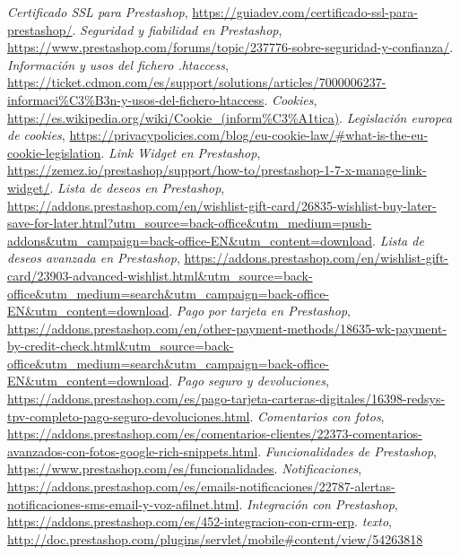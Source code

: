 \documentclass{article}
\begin{document}
\begin{thebibliography}{9}
 \textit{Certificado SSL para Prestashop}, \url{https://guiadev.com/certificado-ssl-para-prestashop/}.
 \textit{Seguridad y fiabilidad en Prestashop}, \url{https://www.prestashop.com/forums/topic/237776-sobre-seguridad-y-confianza/}.
 \textit{Información y usos del fichero .htaccess}, \url{https://ticket.cdmon.com/es/support/solutions/articles/7000006237-informaci\%C3\%B3n-y-usos-del-fichero-htaccess}.
 \textit{Cookies}, \url{https://es.wikipedia.org/wiki/Cookie_(inform\%C3\%A1tica)}.
 \textit{Legislación europea de cookies}, \url{https://privacypolicies.com/blog/eu-cookie-law/#what-is-the-eu-cookie-legislation}.
 \textit{Link Widget en Prestashop}, \url{https://zemez.io/prestashop/support/how-to/prestashop-1-7-x-manage-link-widget/}.
 \textit{Lista de deseos en Prestashop}, \url{https://addons.prestashop.com/en/wishlist-gift-card/26835-wishlist-buy-later-save-for-later.html?utm_source=back-office&utm_medium=push-addons&utm_campaign=back-office-EN&utm_content=download}.
 \textit{Lista de deseos avanzada en Prestashop}, \url{https://addons.prestashop.com/en/wishlist-gift-card/23903-advanced-wishlist.html&utm_source=back-office&utm_medium=search&utm_campaign=back-office-EN&utm_content=download}.
 \textit{Pago por tarjeta en Prestashop}, \url{https://addons.prestashop.com/en/other-payment-methods/18635-wk-payment-by-credit-check.html&utm_source=back-office&utm_medium=search&utm_campaign=back-office-EN&utm_content=download}.
 \textit{Pago seguro y devoluciones}, \url{https://addons.prestashop.com/es/pago-tarjeta-carteras-digitales/16398-redsys-tpv-completo-pago-seguro-devoluciones.html}.
 \textit{Comentarios con fotos}, \url{https://addons.prestashop.com/es/comentarios-clientes/22373-comentarios-avanzados-con-fotos-google-rich-snippets.html}.
 \textit{Funcionalidades de Prestashop}, \url{https://www.prestashop.com/es/funcionalidades}.
 \textit{Notificaciones}, \url{https://addons.prestashop.com/es/emails-notificaciones/22787-alertas-notificaciones-sms-email-y-voz-afilnet.html}.
 \textit{Integración con Prestashop}, \url{https://addons.prestashop.com/es/452-integracion-con-crm-erp}.
 \textit{texto}, \url{http://doc.prestashop.com/plugins/servlet/mobile#content/view/54263818}

\end{thebibliography}
\end{document}
